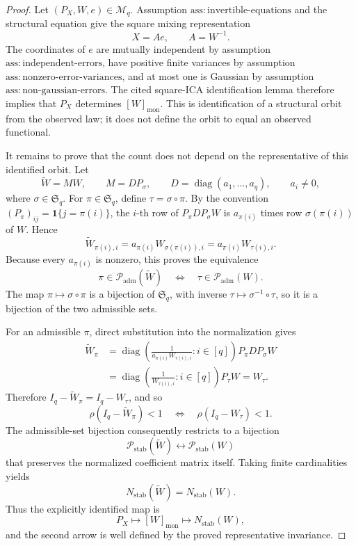 \documentclass{article}
\begin{document}
\begin{proof}
Let \((P_X,W,e)\in\mathcal M_q\). Assumption \(\mathrm{ass:invertible\mbox{-}equations}\) and the structural equation give the square mixing representation
\[
 X=Ae,\qquad A=W^{-1}.
\]
The coordinates of \(e\) are mutually independent by assumption \(\mathrm{ass:independent\mbox{-}errors}\), have positive finite variances by assumption \(\mathrm{ass:nonzero\mbox{-}error\mbox{-}variances}\), and at most one is Gaussian by assumption \(\mathrm{ass:non\mbox{-}gaussian\mbox{-}errors}\). The cited square-ICA identification lemma therefore implies that \(P_X\) determines \([W]_{\mathrm{mon}}\). This is identification of a structural orbit from the observed law; it does not define the orbit to equal an observed functional.

It remains to prove that the count does not depend on the representative of this identified orbit. Let
\[
 \widetilde W=MW,
 \qquad
 M=D P_\sigma,
 \qquad
 D=\operatorname{diag}(a_1,\ldots,a_q),
 \qquad a_i\neq0,
\]
where \(\sigma\in\mathfrak S_q\). For \(\pi\in\mathfrak S_q\), define \(\tau=\sigma\circ\pi\). By the convention \((P_\pi)_{ij}=\mathbf 1\{j=\pi(i)\}\), the \(i\)-th row of \(P_\pi D P_\sigma W\) is \(a_{\pi(i)}\) times row \(\sigma(\pi(i))\) of \(W\). Hence
\[
 \widetilde W_{\pi(i),i}
 =a_{\pi(i)}W_{\sigma(\pi(i)),i}
 =a_{\pi(i)}W_{\tau(i),i}.
\]
Because every \(a_{\pi(i)}\) is nonzero, this proves the equivalence
\[
 \pi\in\mathcal P_{\mathrm{adm}}(\widetilde W)
 \quad\Longleftrightarrow\quad
 \tau\in\mathcal P_{\mathrm{adm}}(W).
\]
The map \(\pi\mapsto\sigma\circ\pi\) is a bijection of \(\mathfrak S_q\), with inverse \(\tau\mapsto\sigma^{-1}\circ\tau\), so it is a bijection of the two admissible sets.

For an admissible \(\pi\), direct substitution into the normalization gives
\[
 \begin{aligned}
 \widetilde W_\pi
 &=\operatorname{diag}\!\left(
      \frac{1}{a_{\pi(i)}W_{\tau(i),i}}:i\in[q]
    \right)P_\pi D P_\sigma W\\
 &=\operatorname{diag}\!\left(
      \frac{1}{W_{\tau(i),i}}:i\in[q]
    \right)P_\tau W
 =W_\tau.
 \end{aligned}
\]
Therefore \(I_q-\widetilde W_\pi=I_q-W_\tau\), and so
\[
 \rho(I_q-\widetilde W_\pi)<1
 \quad\Longleftrightarrow\quad
 \rho(I_q-W_\tau)<1.
\]
The admissible-set bijection consequently restricts to a bijection
\[
 \mathcal P_{\mathrm{stab}}(\widetilde W)
 \longleftrightarrow
 \mathcal P_{\mathrm{stab}}(W)
\]
that preserves the normalized coefficient matrix itself. Taking finite cardinalities yields
\[
 N_{\mathrm{stab}}(\widetilde W)=N_{\mathrm{stab}}(W).
\]
Thus the explicitly identified map is
\[
 P_X\longmapsto[W]_{\mathrm{mon}}
       \longmapsto N_{\mathrm{stab}}(W),
\]
and the second arrow is well defined by the proved representative invariance.
\end{proof}
\end{document}
